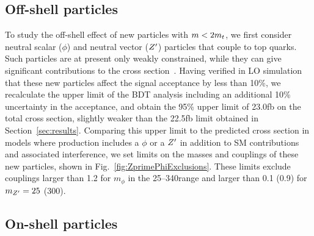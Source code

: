 \subsection{Off-shell particles}

To study the off-shell effect of new particles with $m < 2m_t$, we first
consider neutral scalar ($\phi$) and neutral vector ($Z^\prime$) particles that
couple to top quarks. Such particles are at present only weakly constrained,
while they can give significant contributions to the \tttt cross
section~\cite{THEORY:Alvarez2016nrz}. Having verified in LO simulation that these
new particles affect the signal acceptance by less than 10\%, we recalculate
the \xsectttt upper limit of the BDT analysis including an additional 10\%
uncertainty in the acceptance, and obtain the 95\% \CL upper limit of
23.0\unit{fb} on the total \tttt cross section, slightly weaker than the
22.5\unit{fb} limit obtained in Section~\ref{sec:results}. Comparing this
upper limit to the predicted cross section in models where \tttt production
includes a $\phi$ or a $Z^\prime$ in addition to SM contributions and
associated interference, we set limits on the masses and couplings of these
new particles, shown in Fig.~\ref{fig:ZprimePhiExclusions}. These limits
exclude couplings larger than 1.2 for $m_{\phi}$ in the 25--340\GeV range and
larger than 0.1 (0.9) for $m_{Z^\prime} = 25$ (300)\GeV.

\subsection{On-shell particles}

